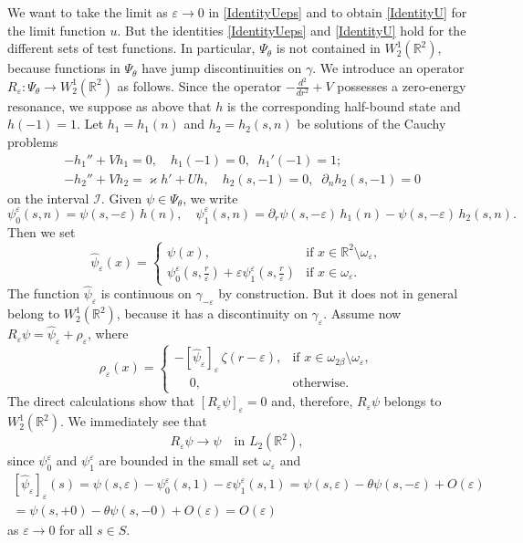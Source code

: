 \documentclass[reqno]{amsart}
\theoremstyle{plain}
\numberwithin{equation}{section}
\renewcommand{\kappa}{\varkappa}
\newcommand{\Real}{\mathbb R}
\newcommand{\eps}{\varepsilon}
\newcommand{\cI}{\mathcal{I}}
\begin{document}
We want to take the limit as $\eps\to 0$ in \eqref{IdentityUeps} and to obtain \eqref{IdentityU} for the limit function $u$.
But the identities \eqref{IdentityUeps} and \eqref{IdentityU} hold for the different sets of test functions. In particular, $\Psi_\theta$ is not contained in  $W_2^1(\Real^2)$, because functions in $\Psi_\theta$ have   jump discontinuities on $\gamma$. 
We introduce an operator $R_\eps\colon \Psi_\theta\to W_2^1(\Real^2)$ as follows. 
Since the operator $-\frac{d^2}{d r^2}+V$ possesses a zero-energy resonance, we suppose as above that $h$ is the corresponding half-bound state and $h(-1)=1$. Let
  $h_1=h_1(n)$ and $h_2=h_2(s,n)$ be  solutions of the Cauchy problems
\begin{align}\label{ProblemH1}
&-h_1''+Vh_1=0,\quad  h_1(-1)=0, \;\; h_1'(-1)=1;
\\\label{ProblemH2}
& -h_2''+Vh_2=\kappa h'+U h,\quad
h_2(s,-1)=0, \;\; \partial_n h_2(s,-1)=0
\end{align}
on the interval $\cI$. Given $\psi\in \Psi_\theta$, we write
\begin{equation}\label{Psi0Psi1}
  \psi_0^\eps(s,n)=\psi(s,-\eps)\,h(n), \quad
  \psi_1^\eps(s,n)=\partial_r\psi(s,-\eps)\,h_1(n)
     -\psi(s,-\eps)\,h_2(s,n).
\end{equation}
Then we set
\begin{equation*}
  \hat{\psi}_\eps(x)=
  \begin{cases}
    \psi(x), & \text{if } x\in \Real^2\setminus \omega_\eps,\\
     \psi_0^\eps(s,\tfrac{r}{\eps})
     +\eps \psi_1^\eps\left(s,\tfrac{r}{\eps}\right)& \text{if } x\in \omega_\eps.
  \end{cases}
\end{equation*}
The function $\hat{\psi}_\eps$ is continuous on $\gamma_{-\eps}$ by construction. But it does not in general belong to $W_2^1(\Real^2)$, because it  has a  discontinuity on $\gamma_{\eps}$. Assume now $R_\eps\psi=\hat{\psi}_\eps+\rho_\eps$, where
\begin{equation*}
\rho_\eps(x)=
\begin{cases}
  -[\hat{\psi}_\eps]_{\eps}\,\zeta(r-\eps),& \text{if }x\in
  \omega_{2\beta}\setminus \omega_\eps,\\
  \phantom{-}0,& \text{otherwise}.
\end{cases}
\end{equation*}
The direct calculations show that $[R_\eps\psi]_{\eps}=0$  and, therefore, $R_\eps\psi$ belongs to $W_2^1(\Real^2)$.
We immediately see that
\begin{equation}\label{RepsConv}
  R_\eps\psi\to \psi \quad\text{in } L_2(\Real^2),
\end{equation}
since $\psi_0^\eps$ and $\psi_1^\eps$ are bounded in the small set $\omega_\eps$ and
\begin{multline}\label{JumpHatPsi}
[\hat{\psi}_\eps]_{\eps}(s)=\psi(s,\eps)-\psi_0^\eps(s,1)-\eps\psi_1^\eps(s,1) =\psi(s,\eps)-\theta\psi(s,-\eps)+O(\eps)\\
  =
  \psi(s,+0)-\theta\psi(s,-0)+O(\eps)=O(\eps)
\end{multline}
as  $\eps\to 0$ for all $s\in S$.
\end{document}
